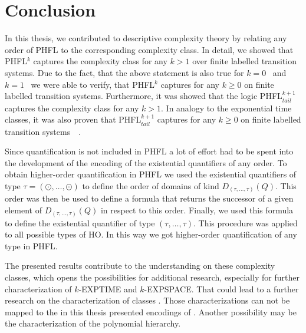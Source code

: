 \chapter{Conclusion}

In this thesis, we contributed to descriptive complexity theory by relating any order of PHFL to the corresponding complexity class. In detail, we showed that PHFL$^k$ captures the complexity class  for any $k > 1$ over finite labelled transition systems. Due to the fact, that the above statement is also true for $k = 0$~\cite{otto1999bisimulation} and $k = 1$~\cite{lange2014capturing} we were able to verify, that PHFL$^k$ captures  for any $k \geq 0$ on finite labelled transition systems. Furthermore, it was showed that the logic PHFL$^{k+1}_{tail}$ captures the complexity class  for any $k > 1$. In analogy to the exponential time classes, it was also proven that PHFL$^{k+1}_{tail}$ captures  for any $k \geq 0$ on finite labelled transition systems~\cite{otto1999bisimulation}~\cite{lange2014capturing}.

Since quantification is not included in PHFL a lot of effort had to be spent into the development of the encoding of the existential quantifiers of any order.
To obtain higher-order quantification in PHFL we used the existential quantifiers of type $\tau = (\odot, \dots, \odot)$ to define the order of domains of kind
$D_{(\tau, \dots, \tau)}(Q)$. This order was then be used to define a formula that returns the successor
of a given element of $D_{(\tau, \dots, \tau)}(Q)$ in respect to this order. Finally, we used this
formula to define the existential quantifier of type $(\tau, \dots, \tau)$. This procedure was applied to all
possible types of HO. In this way we got higher-order quantification of any type in PHFL.

The presented results contribute to the understanding on these complexity classes, which opens the possibilities for additional research, especially for further characterization of $k$-EXPTIME and $k$-EXPSPACE. That could lead to a further research on the characterization of classes . Those characterizations can not be mapped to the in this thesis presented encodings of . Another possibility may be the characterization of the polynomial hierarchy.